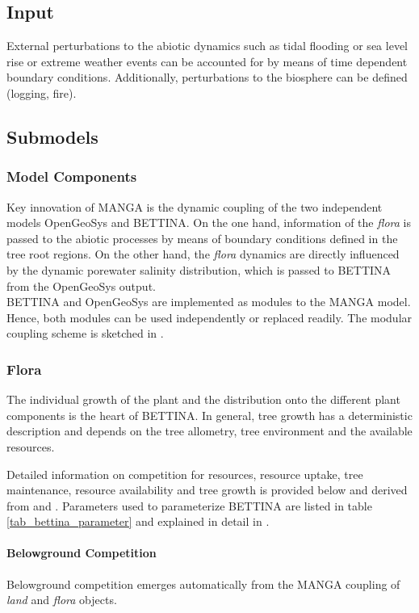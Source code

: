 \subsection{Input}
External perturbations to the abiotic dynamics such as tidal flooding or sea level rise or extreme weather events can be accounted for by means of time dependent boundary conditions.
Additionally, perturbations to the biosphere can be defined (logging, fire). 
\subsection{Submodels}
\subsubsection{Model Components}
Key innovation of MANGA is the dynamic coupling of the two independent models OpenGeoSys and BETTINA.
On the one hand, information of the \textit{flora} is passed to the abiotic processes by means of boundary conditions defined in the tree root regions.
On the other hand, the \textit{flora} dynamics are directly influenced by the dynamic porewater salinity distribution, which is passed to BETTINA from the OpenGeoSys output.\\
BETTINA and OpenGeoSys are implemented as modules to the MANGA model.
Hence, both modules can be used independently or replaced readily.
The modular coupling scheme is sketched in \citet{Bathmann2020}.


\subsubsection{Flora}
The individual growth of the plant and the distribution onto the different plant components is the heart of BETTINA.
In general, tree growth has a deterministic description and depends on the tree allometry, tree environment and the available resources.

Detailed information on competition for resources, resource uptake, tree maintenance, resource availability and tree growth is provided below and derived from \citet{Ronny2014} and \citet{Peters2018}.
Parameters used to parameterize BETTINA are listed in table \ref{tab_bettina_parameter} and explained in detail in \citet{Ronny2014}.
\paragraph{\textbf{Belowground Competition}}
Belowground competition emerges automatically from the MANGA coupling of \textit{land} and \textit{flora} objects.
